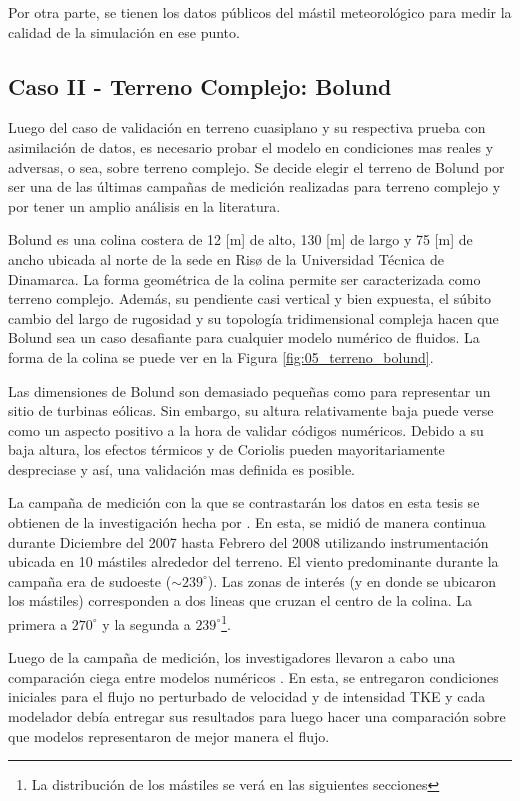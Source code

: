 Por otra parte, se tienen los datos públicos del mástil meteorológico para medir la calidad de la simulación en ese punto.
\subsection{Caso II - Terreno Complejo: Bolund}
Luego del caso de validación en terreno cuasiplano y su respectiva prueba con asimilación de datos, es necesario probar el modelo en condiciones mas reales y adversas, o sea, sobre terreno complejo. Se decide elegir el terreno de Bolund por ser una de las últimas campañas de medición realizadas para terreno complejo y por tener un amplio análisis en la literatura.

Bolund es una colina costera de 12 [m] de alto, 130 [m] de largo y 75 [m] de ancho ubicada al norte de la sede en Risø de la Universidad Técnica de Dinamarca. La forma geométrica de la colina permite ser caracterizada como terreno complejo. Además, su pendiente casi vertical y bien expuesta, el súbito cambio del largo de rugosidad y su topología tridimensional compleja hacen que Bolund sea un caso desafiante para cualquier modelo numérico de fluidos. La forma de la colina se puede ver en la Figura \ref{fig:05_terreno_bolund}.

Las dimensiones de Bolund son demasiado pequeñas como para representar un sitio de turbinas eólicas. Sin embargo, su altura relativamente baja puede verse como un aspecto positivo a la hora de validar códigos numéricos. Debido a su baja altura, los efectos térmicos y de Coriolis pueden mayoritariamente despreciase y así, una validación mas definida es posible.

La campaña de medición con la que se contrastarán los datos en esta tesis se obtienen de la investigación hecha por \cite{3d4285ac04444eb3b9775baf9af052c6}. En esta, se midió de manera continua durante Diciembre del 2007 hasta Febrero del 2008 utilizando instrumentación ubicada en 10 mástiles alrededor del terreno.  El viento predominante durante la campaña era de sudoeste ($\sim\!239^\circ$). Las zonas de interés (y en donde se ubicaron los mástiles) corresponden a dos lineas que cruzan el centro de la colina. La primera a $270^\circ$ y la segunda a $239^\circ$\footnote{La distribución de los mástiles se verá en las siguientes secciones}.

Luego de la campaña de medición, los investigadores llevaron a cabo una comparación ciega entre modelos numéricos \citep{Bechmann2011}. En esta, se entregaron condiciones iniciales para el flujo no perturbado de velocidad y de intensidad TKE y cada modelador debía entregar sus resultados para luego hacer una comparación sobre que modelos representaron de mejor manera el flujo.

